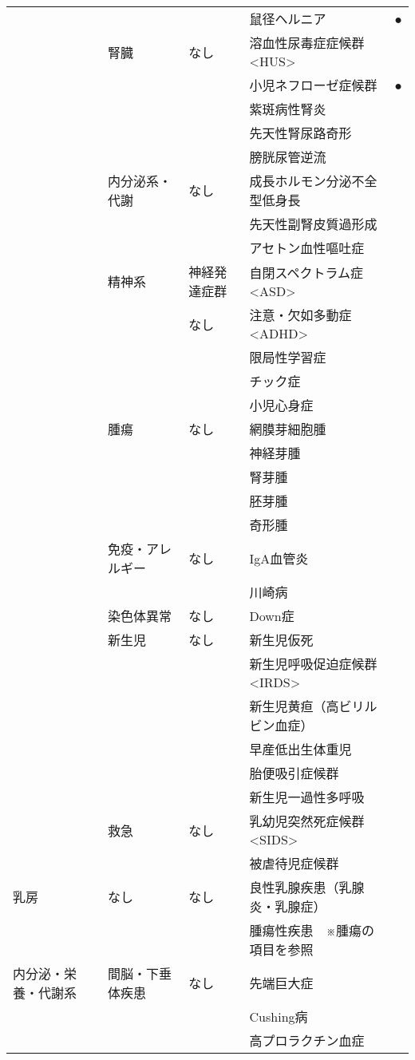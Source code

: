 \begin{xltabular}{\linewidth}{XXXXX}
 &  &  & 鼠径ヘルニア & ● \\
 & 腎臓 & なし & 溶血性尿毒症症候群 <HUS> &  \\
 &  &  & 小児ネフローゼ症候群 & ● \\
 &  &  & 紫斑病性腎炎 &  \\
 &  &  & 先天性腎尿路奇形 &  \\
 &  &  & 膀胱尿管逆流 &  \\
 & 内分泌系・代謝 & なし & 成長ホルモン分泌不全型低身長 &  \\
 &  &  & 先天性副腎皮質過形成 &  \\
 &  &  & アセトン血性嘔吐症 &  \\
 & 精神系 & 神経発達症群 & 自閉スペクトラム症 <ASD> &  \\
 &  & なし & 注意・欠如多動症 <ADHD> &  \\
 &  &  & 限局性学習症 &  \\
 &  &  & チック症 &  \\
 &  &  & 小児心身症 &  \\
 & 腫瘍 & なし & 網膜芽細胞腫 &  \\
 &  &  & 神経芽腫 &  \\
 &  &  & 腎芽腫 &  \\
 &  &  & 胚芽腫 &  \\
 &  &  & 奇形腫 &  \\
 & 免疫・アレルギー & なし & IgA血管炎 &  \\
 &  &  & 川崎病 &  \\
 & 染色体異常 & なし & Down症 &  \\
 & 新生児 & なし & 新生児仮死 &  \\
 &  &  & 新生児呼吸促迫症候群 <IRDS> &  \\
 &  &  & 新生児黄疸（高ビリルビン血症） &  \\
 &  &  & 早産低出生体重児 &  \\
 &  &  & 胎便吸引症候群 &  \\
 &  &  & 新生児一過性多呼吸 &  \\
 & 救急 & なし & 乳幼児突然死症候群 <SIDS> &  \\
 &  &  & 被虐待児症候群 &  \\
乳房 & なし & なし & 良性乳腺疾患（乳腺炎・乳腺症） &  \\
 &  &  & 腫瘍性疾患　※腫瘍の項目を参照 &  \\
内分泌・栄養・代謝系 & 間脳・下垂体疾患 & なし & 先端巨大症 &  \\
 &  &  & Cushing病 &  \\
 &  &  & 高プロラクチン血症 &  \\

\end{xltabular}
